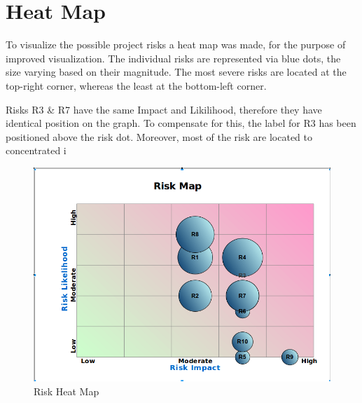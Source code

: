 \documentclass[12pt]{article}
\begin{document}
\section{Heat Map}
To visualize the possible project risks a heat map was made, for the purpose of improved visualization. The individual risks are represented via blue dots, the size varying based on their magnitude. The most severe risks are located at the top-right corner, whereas the least at the bottom-left corner. \par
Risks R3 \& R7 have the same Impact and Likilihood, therefore they have identical position on the graph. To compensate for this, the label for R3 has been positioned above the risk dot. Moreover, most of the risk are located to concentrated i
\FloatBarrier %
\begin{figure}[ht!]
\centering
\includegraphics[width=\linewidth]{RiskMap.png}
\caption{Risk Heat Map}
\label{fig:heatmap}
\end{figure}
\FloatBarrier %

\end{document}
